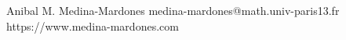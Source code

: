 \documentclass[a4paper]{cv}
\begin{document}
	\Header
	{Anibal M. Medina-Mardones}
	{medina-mardones@math.univ-paris13.fr}
	{https://www.medina-mardones.com}
	\vspace*{10pt}
	
\end{document}
